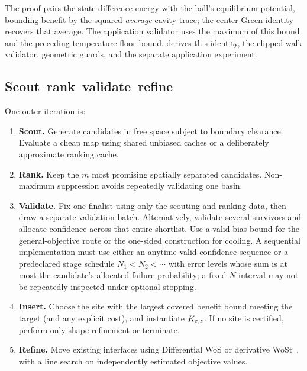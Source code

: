 The proof pairs the state-difference energy with the ball's equilibrium
potential, bounding benefit by the squared \emph{average} cavity trace;
the center Green identity recovers that average. The application validator
uses the maximum of this bound and the preceding temperature-floor bound.
 derives this identity, the clipped-walk
validator, geometric guards, and the separate application experiment.

\subsection{Scout--rank--validate--refine}

One outer iteration is:
\begin{enumerate}
 \item \textbf{Scout.} Generate candidates in free space subject to boundary
 clearance.  Evaluate a cheap \method{} map using shared unbiased caches or a
 deliberately approximate ranking cache.
 \item \textbf{Rank.} Keep the $m$ most promising spatially separated
 candidates.  Non-maximum suppression avoids repeatedly validating one basin.
 \item \textbf{Validate.} Fix one finalist using only the scouting and ranking data, then draw a separate validation batch. Alternatively, validate several survivors and allocate confidence across that entire shortlist. Use a valid bias bound for the general-objective route or the one-sided construction for cooling. A sequential implementation must use either
 an anytime-valid confidence sequence or a predeclared stage schedule
 $N_1<N_2<\cdots$ with error levels whose sum is at most the candidate's
 allocated failure probability; a fixed-$N$ interval may not be repeatedly
 inspected under optional stopping.
 \item \textbf{Insert.} Choose the site with the largest covered benefit bound meeting the
 target (and any explicit cost), and instantiate $K_{\varepsilon,z}$.  If no site is certified, perform
 only shape refinement or terminate.
 \item \textbf{Refine.} Move existing interfaces using Differential WoS or
 derivative WoSt~\cite{miller2024differential,yu2025robust}, with a line search
 on independently estimated objective values.
\end{enumerate}


